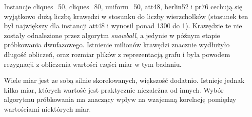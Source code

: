 Instancje cliques\_50, cliques\_80, uniform\_50, att48, berlin52 i pr76 cechują się wyjątkowo dużą liczbą krawędzi
w stosunku do liczby wierzchołków (stosunek ten był największy dla instancji att48 i wynosił ponad 1300 do 1).
Krawędzie te nie zostały odnalezione przez algorytm \textit{snowball}, a jedynie w późnym etapie próbkowania dwufazowego.
Istnienie milionów krawędzi znacznie wydłużyło długość obliczeń, oraz rozmiar plików z reprezentacją grafu i była powodem rezygnacji z obliczenia
wartości części miar w tym badaniu.

Wiele miar jest ze sobą silnie skorelowanych, większość dodatnio.
Istnieje jednak kilka miar, których wartość jest praktycznie niezależna od innych.
Wybór algorytmu próbkowania ma znaczący wpływ na wzajemną korelację pomiędzy wartościami niektórych miar.